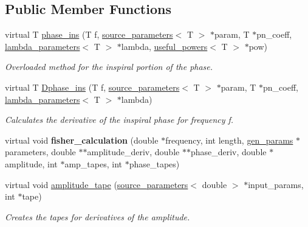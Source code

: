 \subsection*{Public Member Functions}
\begin{DoxyCompactItemize}
\item 
\mbox{\label{classppE__IMRPhenomD__Inspiral_a3187c9dba10e42f0bf20fb1e3bac9a52}} 
virtual T \hyperlink{classppE__IMRPhenomD__Inspiral_a3187c9dba10e42f0bf20fb1e3bac9a52}{phase\+\_\+ins} (T f, \hyperlink{structsource__parameters}{source\+\_\+parameters}$<$ T $>$ $\ast$param, T $\ast$pn\+\_\+coeff, \hyperlink{structlambda__parameters}{lambda\+\_\+parameters}$<$ T $>$ $\ast$lambda, \hyperlink{structuseful__powers}{useful\+\_\+powers}$<$ T $>$ $\ast$pow)
\begin{DoxyCompactList}\small\item\em Overloaded method for the inspiral portion of the phase. \end{DoxyCompactList}\item 
virtual T \hyperlink{classppE__IMRPhenomD__Inspiral_ae297c077497d34a2632c55a7dafb9e83}{Dphase\+\_\+ins} (T f, \hyperlink{structsource__parameters}{source\+\_\+parameters}$<$ T $>$ $\ast$param, T $\ast$pn\+\_\+coeff, \hyperlink{structlambda__parameters}{lambda\+\_\+parameters}$<$ T $>$ $\ast$lambda)
\begin{DoxyCompactList}\small\item\em Calculates the derivative of the inspiral phase for frequency f. \end{DoxyCompactList}\item 
\mbox{\label{classppE__IMRPhenomD__Inspiral_a0bad711ec764c9aaa09b501ea47df252}} 
virtual void {\bfseries fisher\+\_\+calculation} (double $\ast$frequency, int length, \hyperlink{structgen__params}{gen\+\_\+params} $\ast$parameters, double $\ast$$\ast$amplitude\+\_\+deriv, double $\ast$$\ast$phase\+\_\+deriv, double $\ast$amplitude, int $\ast$amp\+\_\+tapes, int $\ast$phase\+\_\+tapes)
\item 
virtual void \hyperlink{classppE__IMRPhenomD__Inspiral_a87474cac9d6086d5625f79e28970b5ed}{amplitude\+\_\+tape} (\hyperlink{structsource__parameters}{source\+\_\+parameters}$<$ double $>$ $\ast$input\+\_\+params, int $\ast$tape)
\begin{DoxyCompactList}\small\item\em Creates the tapes for derivatives of the amplitude. \end{DoxyCompactList}\item 

\end{DoxyCompactItemize}
